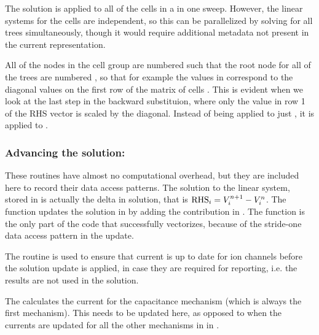 \begin{note}
The solution is applied to all of the cells in a  in one sweep.
However, the linear systems for the cells are independent, so this can be parallelized by solving for all trees simultaneously, though it would require additional metadata not present in the current  representation.

All of the nodes in the cell group are numbered such that the root node for all of the trees are numbered , so that for example the values in  correspond to the diagonal values on the first row of the matrix of cells .
This is evident when we look at the last step in the backward substituion, where only the value in row 1 of the RHS vector is scaled by the diagonal.
Instead of being applied to just , it is applied to .
\end{note}


\subsubsection{Advancing the solution: }
These routines have almost no computational overhead, but they are included here to record their data access patterns.
The solution to the linear system, stored in  is actually the delta in solution, that is ${\text{RHS}}_{i} = {V}_{i}^{n+1} - {V}_{i}^{n}$.
The  function updates the solution in  by adding the contribution in .
The  function is the only part of the \neuron code that successfully vectorizes, because of the stride-one data access pattern in the update.

The  routine is used to ensure that current is up to date for ion channels before the solution update is applied, in case they are required for reporting, i.e. the results are not used in the solution.

The  calculates the current for the capacitance mechanism (which is always the first mechanism). This needs to be updated here, as opposed to when the currents are updated for all the other mechanisms in  in .

